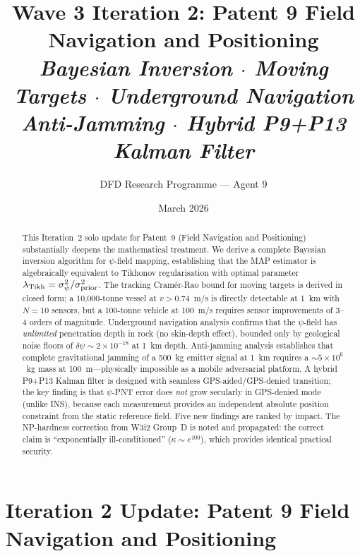 \documentclass[aps,prd,twocolumn,superscriptaddress,nofootinbib]{revtex4-2}
\begin{document}
\title{Wave 3 Iteration 2: Patent 9 Field Navigation and Positioning\\
\textit{Bayesian Inversion $\cdot$ Moving Targets $\cdot$ Underground Navigation\\
Anti-Jamming $\cdot$ Hybrid P9+P13 Kalman Filter}}

\author{DFD Research Programme --- Agent 9}
\date{March 2026}

\begin{abstract}
This Iteration~2 solo update for Patent~9 (Field Navigation and
Positioning) substantially deepens the mathematical treatment.
We derive a complete Bayesian inversion algorithm for $\psi$-field
mapping, establishing that the MAP estimator is algebraically equivalent
to Tikhonov regularisation with optimal parameter
$\lambda_{\rm Tikh} = \sigma_\psi^2/\sigma_{\rm prior}^2$.
The tracking Cram\'er-Rao bound for moving targets is derived in closed
form; a 10,000-tonne vessel at $v > 0.74$~m/s is directly detectable
at 1~km with $N=10$ sensors, but a 100-tonne vehicle at 100~m/s
requires sensor improvements of 3--4 orders of magnitude.
Underground navigation analysis confirms that the $\psi$-field has
\emph{unlimited} penetration depth in rock (no skin-depth effect),
bounded only by geological noise floors of $\delta\psi \sim 2\times10^{-18}$
at 1~km depth.  Anti-jamming analysis establishes that complete
gravitational jamming of a 500~kg emitter signal at 1~km requires a
$\sim 5\times10^6$~kg mass at 100~m---physically impossible as a mobile
adversarial platform.  A hybrid P9+P13 Kalman filter is designed with
seamless GPS-aided/GPS-denied transition; the key finding is that
$\psi$-PNT error does \emph{not} grow secularly in GPS-denied mode
(unlike INS), because each measurement provides an independent absolute
position constraint from the static reference field.
Five new findings are ranked by impact.  The NP-hardness correction from
W3i2 Group~D is noted and propagated: the correct claim is
``exponentially ill-conditioned'' ($\kappa \sim e^{100}$), which
provides identical practical security.
\end{abstract}

\maketitle

\section{Iteration 2 Update: Patent 9 Field Navigation and Positioning}
\label{sec:overview}
\end{document}
